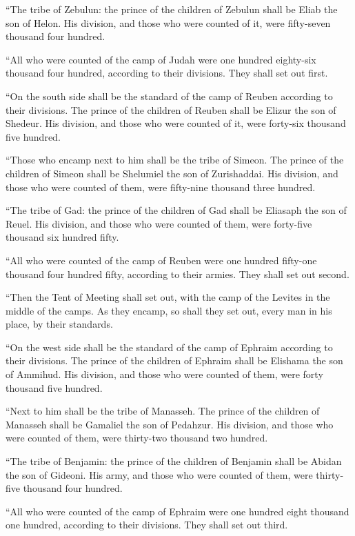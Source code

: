 \myverse{}“The tribe of Zebulun: the prince of the children of Zebulun shall
be Eliab the son of Helon.
\myverse{}His division, and those who were counted of it, were fifty-seven thousand four
hundred.


\myverse{}“All who were counted of the camp of Judah were one hundred eighty-six
thousand four hundred, according to their divisions. They shall set out first.


\myverse{}“On the south side shall be the standard of the camp of Reuben
according to their divisions. The prince of the children of Reuben shall be Elizur the son of Shedeur.
\myverse{}His division, and those who were counted of it, were forty-six thousand five
hundred.


\myverse{}“Those who encamp next to him shall be the tribe of Simeon. The
prince of the children of Simeon shall be Shelumiel the son of Zurishaddai.
\myverse{}His division, and those who were counted of them, were fifty-nine thousand
three hundred.


\myverse{}“The tribe of Gad: the prince of the children of Gad shall be
Eliasaph the son of Reuel.
\myverse{}His division, and those who were counted of them, were forty-five thousand
six hundred fifty.


\myverse{}“All who were counted of the camp of Reuben were one hundred
fifty-one thousand four hundred fifty, according to their armies. They shall set out second.


\myverse{}“Then the Tent of Meeting shall set out, with the camp of the
Levites in the middle of the camps. As they encamp, so shall they set out, every man in his place, by
their standards.


\myverse{}“On the west side shall be the standard of the camp of Ephraim
according to their divisions. The prince of the children of Ephraim shall be Elishama the son of Ammihud.
\myverse{}His division, and those who were counted of them, were forty thousand five
hundred.


\myverse{}“Next to him shall be the tribe of Manasseh. The prince of the
children of Manasseh shall be Gamaliel the son of Pedahzur.
\myverse{}His division, and those who were counted of them, were thirty-two thousand
two hundred.


\myverse{}“The tribe of Benjamin: the prince of the children of Benjamin
shall be Abidan the son of Gideoni.
\myverse{}His army, and those who were counted of them, were thirty-five thousand four
hundred.


\myverse{}“All who were counted of the camp of Ephraim were one hundred
eight thousand one hundred, according to their divisions. They shall set out third.


